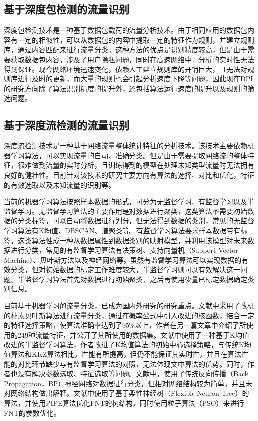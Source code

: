 \documentclass[a4papper]{article}
\begin{document}
\subsection{基于深度包检测的流量识别}
\par\setlength{\parindent}{2em} %
深度包检测技术是一种基于数据包载荷的流量分析技术。由于相同应用的数据包内容有一定的相似性，可以从数据包的内容中提取一定的特征作为规则，并建立规则库，通过内容匹配来进行流量分类。这种方法的优点是识别精度较高，但是由于需要获取数据包内容，涉及了用户隐私问题，同时在高速网络中，分析的实时性无法得到保证。现今网络环境迅速变化，依赖人工建立规则库的开销巨大，且无法对规则库进行及时的更新，而大量的规则也会引起分析速度下降等问题，因此现在DPI的研究方向除了算法识别精度的提升外，还包括算法运行速度的提升以及规则的筛选问题。
\subsection{基于深度流检测的流量识别}
\par\setlength{\parindent}{2em} %
深度流检测技术是一种基于网络流量整体统计特征的分析技术。该技术主要依赖机器学习算法，可以实现流量的自动、准确分类。但是由于需要提取网络流的整体特征，很难做到流量的实时分析，且训练得到的模型在处理未知类型流量时无法拥有良好的健壮性。目前针对该技术的研究主要方向有算法的选择、对比和优化，特征的有效选取以及未知流量的识别等。
\par\setlength{\parindent}{2em} %
当前的机器学习算法按照样本数据的形式，可分为无监督学习、有监督学习以及半监督学习。无监督学习算法的主要作用是对数据进行聚类，这类算法不需要初始数据的分类标签，可以自动将数据进行划分，但无法得到数据的类别，常见的无监督学习算法有K均值、DBSCAN、谱聚类等。有监督学习算法要求样本数据带有标签，这类算法性成一种从数据属性到数据类别的映射模型，并利用该模型对未来数据进行分类，常见的有监督学习算法有决策树、支持向量机（Support Vector Machine）、贝叶斯方法以及神经网络等。虽然有监督学习算法可以实现数据的有效分类，但对初始数据的标定工作难度较大，半监督学习则可以有效解决这一问题。半监督学习算法首先对数据进行初始聚类，之后再使用少量已标定数据确定类别信息。
\par\setlength{\parindent}{2em} %
目前基于机器学习的流量分类，已成为国内外研究的研究重点。文献\cite{Moore:2005:ITC:1071690.1064220}中采用了改机的朴素贝叶斯算法进行流量分类，通过在概率公式中引入改进的核函数，结合一定的特征选择策略，使算法准确率达到了95\%以上，作者在另一篇文章\cite{moore2013discriminators}中介绍了所使用的249种流量特征，并公开了其所使用的数据集。文献\cite{林冠洲2011网络流量识别关键技术研究}中使用了一种基于K均值改进的半监督学习算法，作者改进了K均值算法的初始中心选择策略，与传统K均值算法和KKZ算法相比，性能有所提高，但仍不能保证其实时性，并且在算法性能的对比环节缺少与有监督学习算法的对照，无法体现文中算法的优势。同时，作者也没有解决参数选取、特征选取等问题。文献\cite{牟澄2014互联网流量特征智能提取关键技术研究}中，使用了传统反向传播（Back Propagation，BP）神经网络对数据进行分类，但相对网络结构较为简单，并且未对网络结构做出解释。文献\cite{彭立志2015基于机器学习的流量识别关键技术研究}中使用了基于柔性神经树（Flexible Neuron Tree）的算法，并使用PIPE算法优化FNT的树结构，同时使用粒子算法（PSO）来进行FNT的参数优化。
\end{document}

